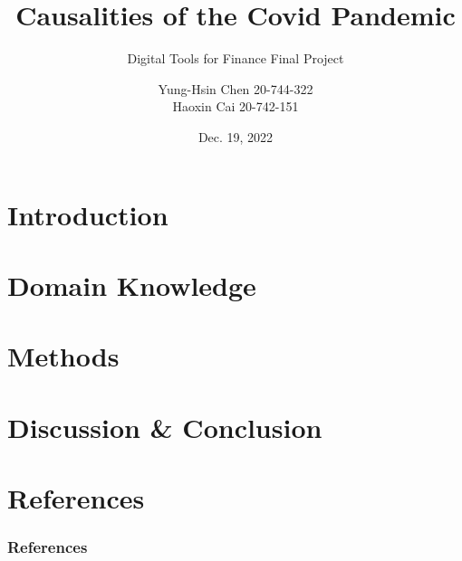 \documentclass{beamer}
\title[Causalities of the Covid Pandemic]{Causalities of the Covid Pandemic}
\subtitle{Digital Tools for Finance Final Project}
\author[Y. Chen, H. Cai]{Yung-Hsin Chen 20-744-322
\\ Haoxin Cai 20-742-151}
\institute[IfI, UZH]{Department of Informatics\\University of Zurich}
\date{Dec. 19, 2022}
\begin{document}
\begin{frame}
\titlepage
\end{frame}


\section{Introduction}


\section{Domain Knowledge}


\section{Methods}


\section{Discussion \& Conclusion}



\section*{References}
\begin{frame}[t,allowframebreaks]
    \frametitle{References}
    \nocite{*}
    \printbibliography[heading=none]
    \end{frame}
\end{document}
